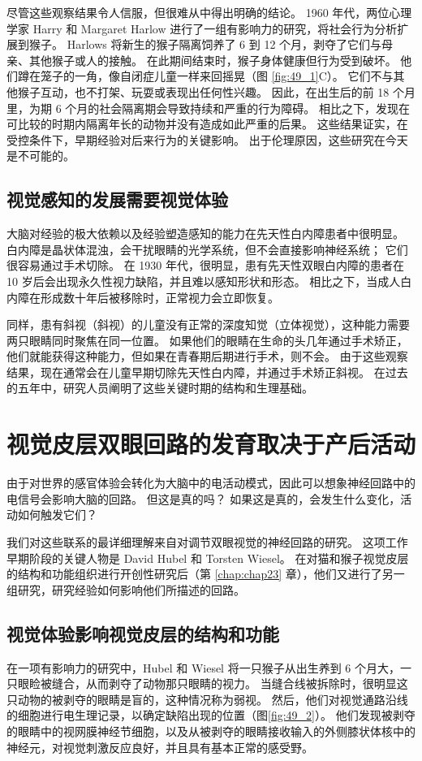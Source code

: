 尽管这些观察结果令人信服，但很难从中得出明确的结论。 1960 年代，两位心理学家 Harry 和 Margaret Harlow 进行了一组有影响力的研究，将社会行为分析扩展到猴子。 Harlows 将新生的猴子隔离饲养了 6 到 12 个月，剥夺了它们与母亲、其他猴子或人的接触。 在此期间结束时，猴子身体健康但行为受到破坏。 他们蹲在笼子的一角，像自闭症儿童一样来回摇晃（图 \ref{fig:49_1}C）。 它们不与其他猴子互动，也不打架、玩耍或表现出任何性兴趣。 因此，在出生后的前 18 个月里，为期 6 个月的社会隔离期会导致持续和严重的行为障碍。 相比之下，发现在可比较的时期内隔离年长的动物并没有造成如此严重的后果。 这些结果证实，在受控条件下，早期经验对后来行为的关键影响。 出于伦理原因，这些研究在今天是不可能的。

\subsection{视觉感知的发展需要视觉体验}

大脑对经验的极大依赖以及经验塑造感知的能力在先天性白内障患者中很明显。 白内障是晶状体混浊，会干扰眼睛的光学系统，但不会直接影响神经系统； 它们很容易通过手术切除。 在 1930 年代，很明显，患有先天性双眼白内障的患者在 10 岁后会出现永久性视力缺陷，并且难以感知形状和形态。 相比之下，当成人白内障在形成数十年后被移除时，正常视力会立即恢复。

同样，患有斜视（斜视）的儿童没有正常的深度知觉（立体视觉），这种能力需要两只眼睛同时聚焦在同一位置。 如果他们的眼睛在生命的头几年通过手术矫正，他们就能获得这种能力，但如果在青春期后期进行手术，则不会。 由于这些观察结果，现在通常会在儿童早期切除先天性白内障，并通过手术矫正斜视。 在过去的五年中，研究人员阐明了这些关键时期的结构和生理基础。

\section{视觉皮层双眼回路的发育取决于产后活动}
由于对世界的感官体验会转化为大脑中的电活动模式，因此可以想象神经回路中的电信号会影响大脑的回路。 但这是真的吗？ 如果这是真的，会发生什么变化，活动如何触发它们？

我们对这些联系的最详细理解来自对调节双眼视觉的神经回路的研究。 这项工作早期阶段的关键人物是 David Hubel 和 Torsten Wiesel。 在对猫和猴子视觉皮层的结构和功能组织进行开创性研究后（第 \ref{chap:chap23} 章），他们又进行了另一组研究，研究经验如何影响他们所描述的回路。

\subsection{视觉体验影响视觉皮层的结构和功能}
在一项有影响力的研究中，Hubel 和 Wiesel 将一只猴子从出生养到 6 个月大，一只眼睑被缝合，从而剥夺了动物那只眼睛的视力。 当缝合线被拆除时，很明显这只动物的被剥夺的眼睛是盲的，这种情况称为弱视。 
然后，他们对视觉通路沿线的细胞进行电生理记录，以确定缺陷出现的位置（图\ref{fig:49_2}）。 
他们发现被剥夺的眼睛中的视网膜神经节细胞，以及从被剥夺的眼睛接收输入的外侧膝状体核中的神经元，对视觉刺激反应良好，并且具有基本正常的感受野。

